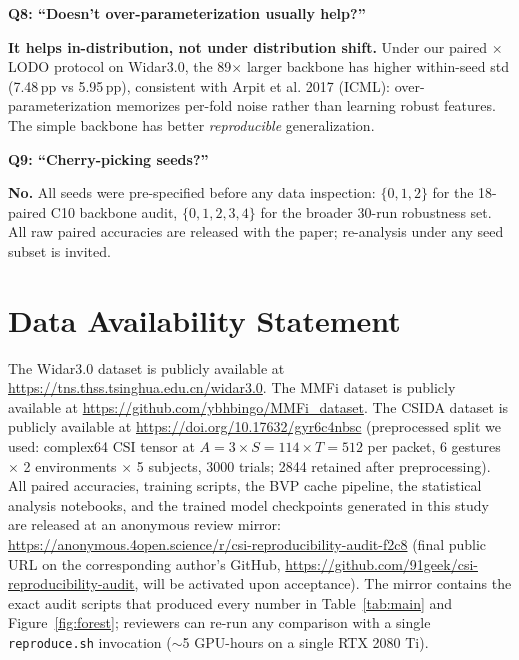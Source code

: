 \documentclass[11pt]{article}
\theoremstyle{definition}
\newcommand{\CSI}{\text{CSI}}
\begin{document}
\medskip
\noindent\textbf{Q8: ``Doesn't over-parameterization usually help?''}

\noindent\textbf{It helps in-distribution, not under distribution shift.} Under our paired $\times$ LODO protocol on Widar3.0, the 89$\times$ larger backbone has higher within-seed std (7.48\,pp vs 5.95\,pp), consistent with Arpit et al. 2017 (ICML): over-parameterization memorizes per-fold noise rather than learning robust features. The simple backbone has better \emph{reproducible} generalization.

\medskip
\noindent\textbf{Q9: ``Cherry-picking seeds?''}

\noindent\textbf{No.} All seeds were pre-specified before any data inspection: $\{0,1,2\}$ for the 18-paired C10 backbone audit, $\{0,1,2,3,4\}$ for the broader 30-run robustness set. All raw paired accuracies are released with the paper; re-analysis under any seed subset is invited.

\section*{Data Availability Statement}

The Widar3.0 dataset is publicly available at \url{https://tns.thss.tsinghua.edu.cn/widar3.0}. The MMFi dataset is publicly available at \url{https://github.com/ybhbingo/MMFi_dataset}. The CSIDA dataset is publicly available at \url{https://doi.org/10.17632/gyr6c4nbsc} (preprocessed split we used: complex64 $\CSI$ tensor at $A{=}3 \times S{=}114 \times T{=}512$ per packet, 6 gestures $\times$ 2 environments $\times$ 5 subjects, 3000 trials; 2844 retained after preprocessing). All paired accuracies, training scripts, the BVP cache pipeline, the statistical analysis notebooks, and the trained model checkpoints generated in this study are released at an anonymous review mirror: \url{https://anonymous.4open.science/r/csi-reproducibility-audit-f2c8} (final public URL on the corresponding author's GitHub, \url{https://github.com/91geek/csi-reproducibility-audit}, will be activated upon acceptance). The mirror contains the exact audit scripts that produced every number in Table~\ref{tab:main} and Figure~\ref{fig:forest}; reviewers can re-run any comparison with a single \texttt{reproduce.sh} invocation ($\sim$5 GPU-hours on a single RTX 2080 Ti).
\end{document}
